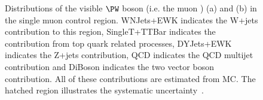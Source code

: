\begin{figure}
  \caption{Distributions of the visible $\PW$ boson \pt (i.e. the muon \pt) (a) and \METnoMU (b) in the single muon control region. WNJets+EWK indicates the W+jets contribution to this region, SingleT+TTBar indicates the contribution from top quark related processes, DYJets+EWK indicates the Z+jets contribution, \ac{QCD} indicates the \ac{QCD} multijet contribution and DiBoson indicates the two vector boson contribution. All of these contributions are estimated from \ac{MC}. The hatched region illustrates the systematic uncertainty~\cite{ARTICLE:CMSAN-12-403}.}
  \label{fig:promptwmunu}
\end{figure}

